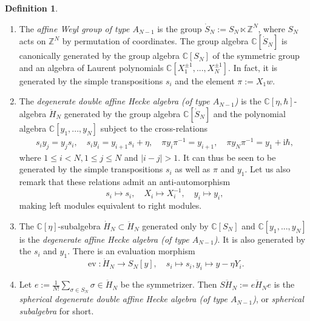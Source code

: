 \documentclass[11pt]{report}
\theoremstyle{definition}
\newtheorem{definition}[theorem]{Definition}
\theoremstyle{remark}
\theoremstyle{remark}
\newcommand{\Z}{\mathbb{Z}}
\newcommand{\C}{\mathbb{C}}
\newcommand{\I}{\mathrm{i}}
\begin{document}
\begin{definition}
\begin{enumerate}[label=(\roman*)]
\item The \emph{affine Weyl group of type $A_{N-1}$} is the group $\dot S_N := S_N \ltimes \Z^N$, where $S_N$ acts on $\Z^N$ by permutation of coordinates. The group algebra $\C[\dot S_N]$ is canonically generated by the group algebra $\C[S_N]$ of the symmetric group and an algebra of Laurent polynomials $\C[X_1^{\pm 1},...,X_N^{\pm 1}]$. In fact, it is generated by the simple transpositions $s_i$ and the element $\pi := X_1 w$.
\item The \emph{degenerate double affine Hecke algebra (of type $A_{N-1}$)} is the $\C[\eta,\hbar]$-algebra $\ddot H_N$ generated by the group algebra $\C[\dot S_N]$ and the polynomial algebra $\C[y_1,...,y_N]$ subject to the cross-relations
\begin{align*}
s_i y_j = y_j s_i, \quad s_i y_i = y_{i+1} s_i + \eta, \quad \pi y_i \pi^{-1} = y_{i+1}, \quad \pi y_N \pi^{-1} = y_1 + \I \hbar,
\end{align*}
where $1 \leq i < N, 1 \leq j \leq N$ and $|i-j|>1$. It can thus be seen to be generated by the simple transpositions $s_i$ as well as $\pi$ and $y_1$. Let us also remark that these relations admit an anti-automorphism
\begin{equation*}
s_i \mapsto s_i, \quad X_i \mapsto X_i^{-1}, \quad y_i \mapsto y_i,
\end{equation*}
making left modules equivalent to right modules.
\item The $\C[\eta]$-subalgebra $\dot H_N \subset \ddot H_N$ generated only by $\C[S_N]$ and $\C[y_1,...,y_N]$ is the \emph{degenerate affine Hecke algebra (of type $A_{N-1}$)}. It is also generated by the $s_i$ and $y_1$. There is an evaluation morphism
\begin{equation*}
\operatorname{ev}: \dot H_N \to S_N[y], \quad s_i \mapsto s_i, y_i \mapsto y - \eta Y_i.
\end{equation*}
\item Let $e := \frac{1}{N!}\sum_{\sigma \in S_N} \sigma \in \ddot H_N$ be the symmetrizer. Then $S\ddot H_N := e \ddot H_N e$ is the \emph{spherical degenerate double affine Hecke algebra (of type $A_{N-1}$)}, or \emph{spherical subalgebra} for short.
\end{enumerate}
\end{definition}
\end{document}
